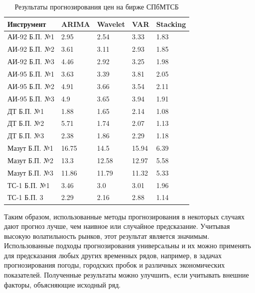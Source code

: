 \documentclass[a4paper,article,14pt]{extarticle}
\begin{document}
\begin{center}
        \begin{longtable}{|p{3.5cm}|p{2cm}|p{2cm}|p{2cm}|p{2cm}|}
            \caption{Результаты прогнозирования цен на бирже СПбМТСБ} \label{tab:exchange_results} \\
            \hline
        \textbf{Инструмент} & \textbf{ARIMA} & \textbf{Wavelet} & \textbf{VAR} & \textbf{Stacking} \\
        \hline
        АИ-92 Б.П. №1 & 2.95 & 2.54 & 3.33 & 1.83 \\
        \hline
        АИ-92 Б.П. №2 & 3.61 & 3.11 & 2.93 & 1.85 \\
        \hline
        АИ-92 Б.П. №3 & 4.46 & 2.92 & 3.25 & 1.98 \\
        \hline
        АИ-95 Б.П. №1 & 3.63 & 3.39 & 3.81 & 2.05 \\
        \hline
        АИ-95 Б.П. №2 & 4.91 & 3.66 & 3.54 & 2.11 \\
        \hline
        АИ-95 Б.П. №3 & 4.9 & 3.65 & 3.94 & 1.91 \\
        \hline
        ДТ Б.П. №1 & 1.88 & 1.65 & 2.14 & 1.08 \\
        \hline
        ДТ Б.П. №2 & 5.71 & 1.74 & 2.07 & 1.13 \\
        \hline
        ДТ Б.П. №3 & 2.38 & 1.86 & 2.29 & 1.18 \\
        \hline
        Мазут Б.П. №1 & 16.75 & 14.5 & 15.94 & 6.39 \\
        \hline
        Мазут Б.П. №2 & 13.3 & 12.58 & 12.97 & 5.58 \\
        \hline
        Мазут Б.П. №3 & 11.86 & 11.79 & 11.32 & 5.33 \\
        \hline
        ТС-1 Б.П. №1 & 3.46 & 3.0 & 3.01 & 1.96 \\
        \hline
        ТС-1 Б.П. 3 & 2.29 & 2.16 & 2.88 & 1.14 \\
        \hline
    \end{longtable}
\end{center}

\pagebreak
{}

Таким образом, использованные методы прогнозирования в некоторых случаях дают прогноз лучше, чем наивное или случайное предсказание.
Учитывая высокую волатильность рынков, этот результат является значимым.
Использованные подходы прогнозирования универсальны и их можно применять для предсказания любых других временных рядов, например, в задачах прогнозирования погоды, городских пробок и различных экономических показателей.
Полученные результаты можно улучшить, если учитывать внешние факторы, объясняющие исходный ряд.
\end{document}
